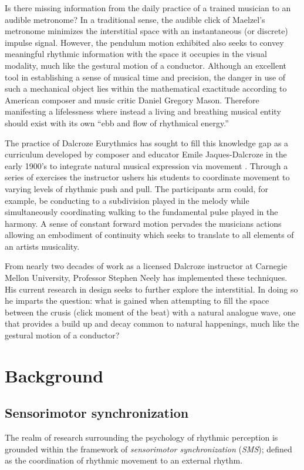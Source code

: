 Is there missing information from the daily practice of a trained musician to an audible metronome? In a traditional sense, the audible click of Maelzel's metronome minimizes the interstitial space with an instantaneous (or discrete) impulse signal. However, the pendulum motion exhibited also seeks to convey meaningful rhythmic information with the space it occupies in the visual modality, much like the gestural motion of a conductor. Although an excellent tool in establishing a sense of musical time and precision, the danger in use of such a mechanical object lies within the mathematical exactitude according to American composer and music critic Daniel Gregory Mason. Therefore manifesting a lifelessness where instead a living and breathing musical entity should exist with its own ``ebb and flow of rhythmical energy.''\cite{fitts2008new}

The practice of Dalcroze Eurythmics has sought to fill this knowledge gap as a curriculum developed by composer and educator Emile Jaques-Dalcroze in the early 1900's to integrate natural musical expression via movement \cite{jaques1930eurhythmics}. Through a series of exercises the instructor ushers his students to coordinate movement to varying levels of rhythmic push and pull. The participants arm could, for example, be conducting to a subdivision played in the melody while simultaneously coordinating walking to the fundamental pulse played in the harmony. A sense of constant forward motion pervades the musicians actions allowing an embodiment of continuity which seeks to translate to all elements of an artists musicality.

From nearly two decades of work as a licensed Dalcroze instructor at Carnegie Mellon University, Professor Stephen Neely has implemented these techniques. His current research in design seeks to further explore the interstitial. In doing so he imparts the question: what is gained when attempting to fill the space between the crusis (click moment of the beat) with a natural analogue wave, one that provides a build up and decay common to natural happenings, much like the gestural motion of a conductor?

\section{Background}
\subsection{Sensorimotor synchronization}
The realm of research surrounding the psychology of rhythmic perception is grounded within the framework of \textit{sensorimotor synchronization} (\textit{SMS}); defined as the coordination of rhythmic movement to an external rhythm. 

